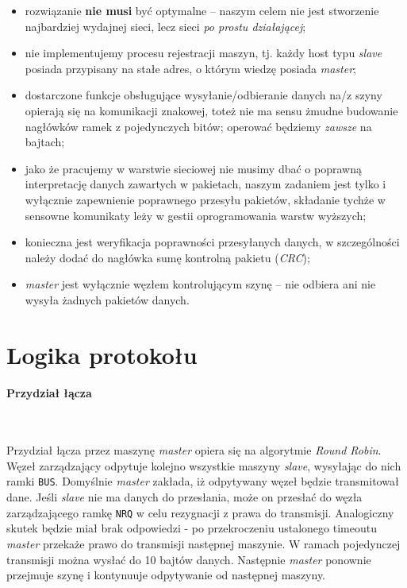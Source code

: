 \documentclass[a4paper,12pt]{article}
\begin{document}
\begin{itemize}
  \item rozwiązanie \textbf{nie musi} być optymalne -- naszym celem nie jest
        stworzenie najbardziej wydajnej sieci, lecz sieci \emph{po prostu
        działającej};
  \item nie implementujemy procesu rejestracji maszyn, tj. każdy host typu
        \emph{slave} posiada przypisany na stałe adres, o którym wiedzę
        posiada \emph{master};
  \item dostarczone funkcje obsługujące wysyłanie/odbieranie danych na/z
        szyny opierają się na komunikacji znakowej, toteż nie ma sensu żmudne
        budowanie nagłówków ramek z pojedynczych bitów; operować będziemy
        \emph{zawsze} na bajtach;
  \item jako że pracujemy w warstwie sieciowej nie musimy dbać o poprawną
        interpretację danych zawartych w pakietach, naszym zadaniem jest
        tylko i wyłącznie zapewnienie poprawnego przesyłu pakietów, składanie
        tychże w sensowne komunikaty leży w gestii oprogramowania warstw
        wyższych;
  \item konieczna jest weryfikacja poprawności przesyłanych danych,
        w szczególności należy dodać do nagłówka sumę kontrolną pakietu
        (\emph{CRC});
  \item \emph{master} jest wyłącznie węzłem kontrolującym szynę -- nie
        odbiera ani nie wysyła żadnych pakietów danych.
\end{itemize}

\section{Logika protokołu}

\paragraph{Przydział łącza}\

Przydział łącza przez maszynę \emph{master} opiera się na algorytmie
\emph{Round Robin}. Węzeł zarządzający odpytuje kolejno wszystkie maszyny
\emph{slave}, wysyłając do nich ramki \texttt{BUS}. Domyślnie \emph{master}
zakłada, iż odpytywany węzeł będzie transmitował dane. Jeśli \emph{slave} nie
ma danych do przesłania, może on przesłać do węzła zarządzającego ramkę
\texttt{NRQ} w celu rezygnacji z prawa do transmisji. Analogiczny skutek będzie
miał brak odpowiedzi - po przekroczeniu ustalonego timeoutu \emph{master}
przekaże prawo do transmisji następnej maszynie. W ramach pojedynczej
transmisji można wysłać do 10 bajtów danych. Następnie \emph{master} ponownie
przejmuje szynę i kontynuuje odpytywanie od następnej maszyny.
\end{document}
